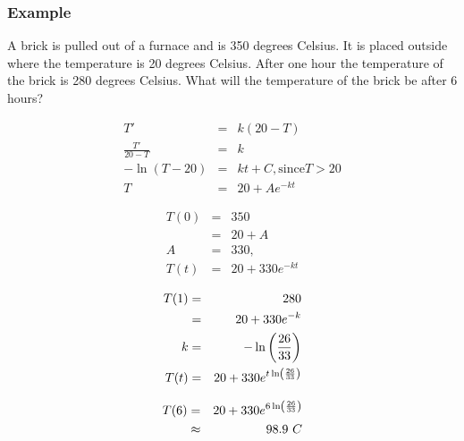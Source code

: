 \begin{frame}
  \frametitle{Example}

  {\color{red}A brick is pulled out of a furnace and is 350 degrees Celsius.} 
  {\color{blue}It is placed outside where the temperature is 20 degrees Celsius.} 
  {\color{purple}After one hour the temperature of the brick is 280 degrees Celsius.}  What will the temperature of the brick be after 6 hours?


\end{frame}


\begin{frame}

  \begin{eqnarray*}
    T' & = & k (20-T) \\
    \frac{T'}{20-T} & = & k \\
    -\ln(T-20) & = & kt + C,  \text{since} T > 20\\
    T & = & 20 + A e^{-kt}
  \end{eqnarray*}

  \begin{eqnarray*}
    T(0) & = & 350 \\
    & = & 20 + A \\
    A & = & 330, \\
    T(t) & = & 20 + 330 e^{-kt}
  \end{eqnarray*}

\end{frame}


\begin{frame}

  \begin{eqnarray*}
    T(1) & = & 280 \\
    & = & 20 + 330 e^{-k} \\
    k & = & -\ln\left(\frac{26}{33}\right) \\
    T(t) & = & 20 + 330 e^{t\ln\left(\frac{26}{33}\right)}
  \end{eqnarray*}

  \begin{eqnarray*}
    T(6) & = & 20 + 330 e^{6\ln\left(\frac{26}{33}\right)} \\
    & \approx & 98.9 ~C
  \end{eqnarray*}

\end{frame}



